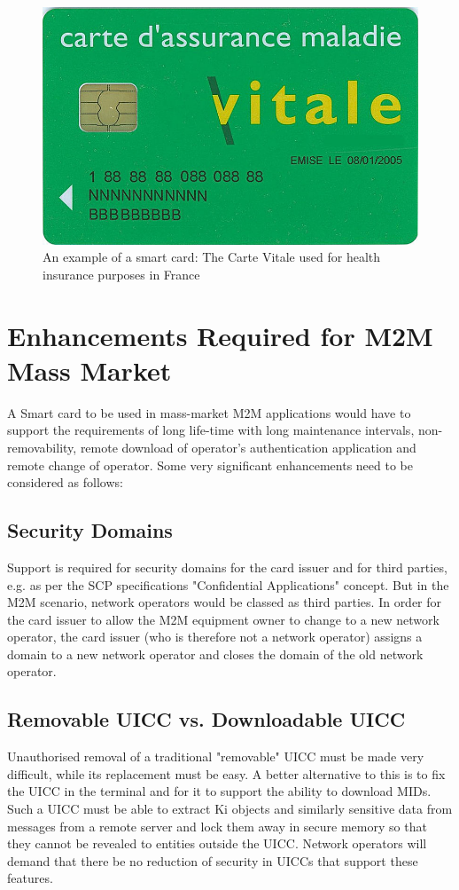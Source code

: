 \documentclass[12pt]{article}
\begin{document}
\begin{figure}[!t]
\centering
    \includegraphics[scale=0.3]{smart_card}
    \caption{An example of a smart card: The Carte Vitale used for health
insurance purposes in France}
    \label{smart_card_france}
\label{adhoc}

\end{figure}


\section{Enhancements Required for M2M Mass Market}
A Smart card to be used in mass-market M2M applications would have to support the requirements of long life-time with long maintenance intervals, non-removability, remote download of operator’s authentication application and remote change of operator. Some very significant enhancements need to be considered as follows:

\subsection{Security Domains}
Support is required for security domains for the card issuer and for third parties, e.g. as per the SCP specifications "Confidential Applications" concept. But in the M2M scenario, network operators would be classed as third parties. In order for the card issuer to allow the M2M equipment owner to change to a new network operator, the card issuer (who is therefore not a network operator) assigns a domain to a new network operator and closes the domain of the old network operator.

\subsection{Removable UICC vs. Downloadable UICC}
Unauthorised removal of a traditional "removable" UICC must be made very difficult, while its replacement must be easy. A better alternative to this is to fix the UICC in the terminal and for it to support the ability to download MIDs. Such a UICC must be able to extract Ki objects and similarly sensitive data from messages from a remote server and lock them away in secure memory so that they cannot be revealed to entities outside the UICC. Network operators will demand that there be no reduction of security in UICCs that support these features.
\end{document}

